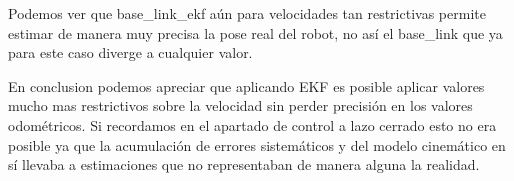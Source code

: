 

Podemos ver que base\_link\_ekf aún para velocidades tan restrictivas permite estimar de manera muy precisa la pose real del robot, no así el base\_link que ya para este caso diverge a cualquier valor.

En conclusion podemos apreciar que aplicando EKF es posible aplicar valores mucho mas restrictivos sobre la velocidad sin perder precisión en los valores odométricos. Si recordamos en el apartado de control a lazo cerrado esto no era posible ya que la acumulación de errores sistemáticos y del modelo cinemático en sí llevaba a estimaciones que no representaban de manera alguna la realidad.





